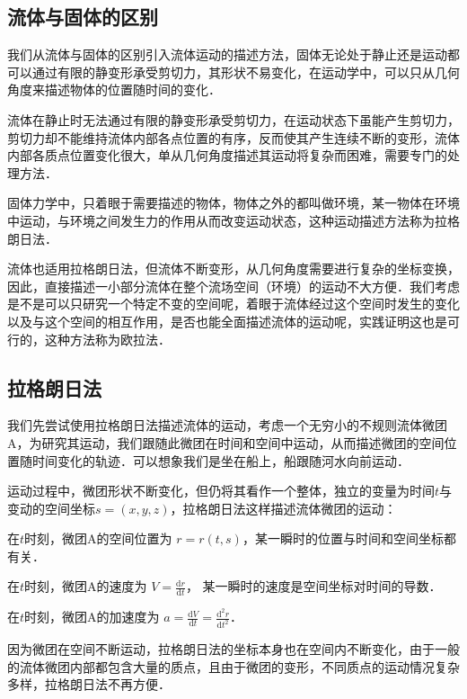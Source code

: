 
\begin{issues}
\issueDraft
\end{issues}

\subsection{流体与固体的区别}
我们从流体与固体的区别引入流体运动的描述方法，固体无论处于静止还是运动都可以通过有限的静变形承受剪切力，其形状不易变化，在运动学中，可以只从几何角度来描述物体的位置随时间的变化．

流体在静止时无法通过有限的静变形承受剪切力，在运动状态下虽能产生剪切力，剪切力却不能维持流体内部各点位置的有序，反而使其产生连续不断的变形，流体内部各质点位置变化很大，单从几何角度描述其运动将复杂而困难，需要专门的处理方法．

固体力学中，只着眼于需要描述的物体，物体之外的都叫做环境，某一物体在环境中运动，与环境之间发生力的作用从而改变运动状态，这种运动描述方法称为拉格朗日法．

流体也适用拉格朗日法，但流体不断变形，从几何角度需要进行复杂的坐标变换，因此，直接描述一小部分流体在整个流场空间（环境）的运动不大方便．我们考虑是不是可以只研究一个特定不变的空间呢，着眼于流体经过这个空间时发生的变化以及与这个空间的相互作用，是否也能全面描述流体的运动呢，实践证明这也是可行的，这种方法称为欧拉法．

\subsection{拉格朗日法}
我们先尝试使用拉格朗日法描述流体的运动，考虑一个无穷小的不规则流体微团A，为研究其运动，我们跟随此微团在时间和空间中运动，从而描述微团的空间位置随时间变化的轨迹．可以想象我们是坐在船上，船跟随河水向前运动．

运动过程中，微团形状不断变化，但仍将其看作一个整体，独立的变量为时间$t$与变动的空间坐标$s=(x,y,z)$，拉格朗日法这样描述流体微团的运动：

在$t$时刻，微团A的空间位置为 $r=r(t,s)$，某一瞬时的位置与时间和空间坐标都有关．

在$t$时刻，微团A的速度为 $V=\frac{\mathrm{d} r}{\mathrm{d} t}$，
某一瞬时的速度是空间坐标对时间的导数．

在$t$时刻，微团A的加速度为 $a=\frac{\mathrm{d} V}{\mathrm{d} t}=\frac{\mathrm{d}^2 r}{\mathrm{d} t^2}$．

因为微团在空间不断运动，拉格朗日法的坐标本身也在空间内不断变化，由于一般的流体微团内部都包含大量的质点，且由于微团的变形，不同质点的运动情况复杂多样，拉格朗日法不再方便．

